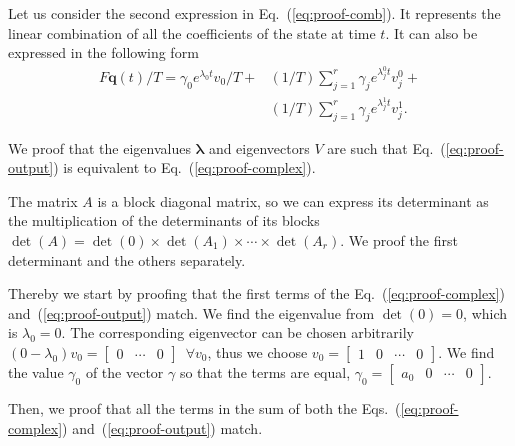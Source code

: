 \documentclass[letterpaper,10pt,journal,twoside]{IEEEtran}
\theoremstyle{definition}
\begin{document}
Let us consider the second expression in Eq.~(\ref{eq:proof-comb}). It represents the linear combination of all the coefficients of the state at time $t$. It can also be expressed in the following form
\begin{equation}\label{eq:proof-output}\begin{split}
  F\mathbf{q}(t)/T=\gamma_0 e^{\lambda_0t}v_0/T+&(1/T)\sum_{j=1}^r{\gamma_j e^{\lambda_j^0t}v_j^0}+\\&(1/T)\sum_{j=1}^r{\gamma_j e^{\lambda_j^1t}v_j^1}.
\end{split}\end{equation}

We proof that the eigenvalues $\mathbf{\lambda}$ and eigenvectors $V$ are such that Eq.~(\ref{eq:proof-output}) is equivalent to Eq.~(\ref{eq:proof-complex}).

The matrix $A$ is a block diagonal matrix, so we can express its determinant as the multiplication of the determinants of its blocks $\det{(A)}=\det{(0)}\times\det{(A_1)}\times\cdots\times\det{(A_r)}$. We proof the first determinant and the others separately.

Thereby we start by proofing that the first terms of the Eq.~(\ref{eq:proof-complex}) and~(\ref{eq:proof-output}) match. We find the eigenvalue from $\det(0)=0$, which is $\lambda_0=0$. The corresponding eigenvector can be chosen arbitrarily $(0-\lambda_0)v_0=\begin{bmatrix} 0 & \cdots & 0 \end{bmatrix}\,\,\,\forall v_0$, thus we choose $v_0=\begin{bmatrix}1 & 0 & \cdots & 0\end{bmatrix}$. We find the value $\gamma_0$ of the vector $\gamma$ so that the terms are equal, $\gamma_0=\begin{bmatrix}a_0 & 0 & \cdots & 0\end{bmatrix}$. 

Then, we proof that all the terms in the sum of both the Eqs.~(\ref{eq:proof-complex}) and~(\ref{eq:proof-output}) match. 
\end{document}
